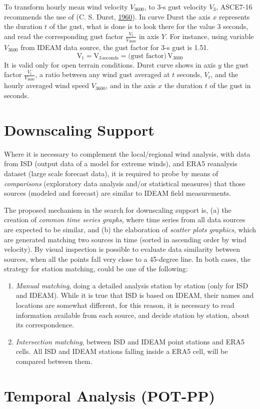 \documentclass[12pt,twoside]{reedthesis}
\begin{document}
To transform hourly mean wind velocity \(V_{3600}\), to 3-s gust velocity \(V_3\), ASCE7-16 recommends the use of (C. S. Durst, \protect\hyperlink{ref-Durst1960}{1960}). In curve Durst the axis \(x\) represents the duration \(t\) of the gust, what is done is to look there for the value 3 seconds, and read the corresponding gust factor \(\frac{V_t}{V_{3600}}\) in axis \(Y\). For instance, using variable \(V_{3600}\) from IDEAM data source, the gust factor for 3-s gust is 1.51.
\begin{equation}
\mathrm{
        V_t = V_{3\,\textrm{seconds}} = \textrm{(gust factor)}\,V_{3600}
       }
  \label{eq:vt}
\end{equation}
It is valid only for open terrain conditions. Durst curve shows in axis \(y\) the gust factor \(\frac{V_t}{V_{3600}}\), a ratio between any wind gust averaged at \(t\) seconds, \(V_t\), and the hourly averaged wind speed \(V_{3600}\), and in the axis \(x\) the duration \(t\) of the gust in seconds.

\hypertarget{ds}{%
\section{Downscaling Support}\label{ds}}

Where it is necessary to complement the local/regional wind analysis, with data from ISD (output data of a model for extreme winds), and ERA5 reanalysis dataset (large scale forecast data), it is required to probe by means of \emph{comparisons} (exploratory data analysis and/or statistical measures) that those sources (modeled and forecast) are similar to IDEAM field measurements.

The proposed mechanism in the search for downscaling support is, (a) the creation of \emph{common time series graphs}, where time series from all data sources are expected to be similar, and (b) the elaboration of \emph{scatter plots graphics}, which are generated matching two sources in time (sorted in ascending order by wind velocity). By visual inspection is possible to evaluate data similarity between sources, when all the points fall very close to a 45-degree line. In both cases, the strategy for station matching, could be one of the following:
\begin{enumerate}
\def\labelenumi{\arabic{enumi}.}
\item
  \emph{Manual matching}, doing a detailed analysis station by station (only for ISD and IDEAM). While it is true that ISD is based on IDEAM, their names and locations are somewhat different, for this reason, it is necessary to read information available from each source, and decide station by station, about its correspondence.
\item
  \emph{Intersection matching}, between ISD and IDEAM point stations and ERA5 cells. All ISD and IDEAM stations falling inside a ERA5 cell, will be compared between them.
\end{enumerate}
\hypertarget{pot-pp}{%
\section{Temporal Analysis (POT-PP)}\label{pot-pp}}
\end{document}
